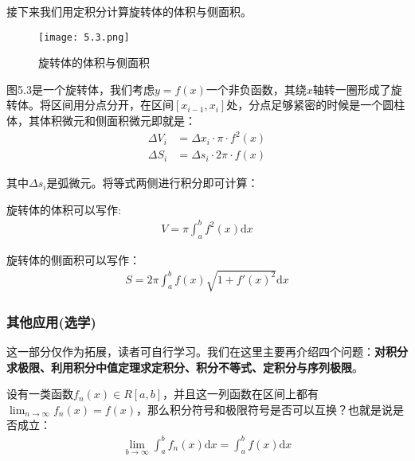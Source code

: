 \documentclass{ctexart}
\let\oldtextbf\textbf %
\renewcommand{\textbf}[1]{\textcolor{btex}{\oldtextbf{#1}}} %
\begin{document}
接下来我们用定积分计算旋转体的体积与侧面积。
\begin{figure}[H]    
\centering     
\renewcommand{\figurename}{图}     
\renewcommand{\thefigure}{5.3}    
\begin{myimagebox}[width=0.43\textwidth] %
\texttt{[image: 5.3.png]} %
\end{myimagebox}     
\caption{\label{fig:5.3}旋转体的体积与侧面积}   
\end{figure}

图5.3是一个旋转体，我们考虑$y=f(x)$一个非负函数，其绕$x$轴转一圈形成了旋转体。将区间用分点分开，在区间$[x_{i-1},x_i]$处，分点足够紧密的时候是一个圆柱体，其体积微元和侧面积微元即就是：
\begin{align*}
    \Delta V_i&=\Delta x_i\cdot \pi \cdot f^2(x)\\
    \Delta S_i&=\Delta s_i\cdot 2\pi\cdot f(x)
\end{align*}

其中$\Delta s_i$是弧微元。将等式两侧进行积分即可计算：
\begin{tcolorbox}[
    colback=bac2,     %
    colframe=fra2,   %
    coltitle=white,             %
    coltext=tex2,
    title=旋转体的侧面积和体积,
    fonttitle=\bfseries,        %
arc=3mm,                     %
breakable
]
旋转体的体积可以写作:
\begin{align*}
    V=\pi\int_a^b f^2(x)\mathrm{d}x\tag{5-13}
\end{align*}

旋转体的侧面积可以写作：
\begin{align*}
    S=2\pi \int_a^b f(x)\sqrt{1+f'(x)^2}\mathrm{d}x\tag{5-14}
\end{align*}
\end{tcolorbox}

\subsubsection{其他应用(选学)}
这一部分仅作为拓展，读者可自行学习。我们在这里主要再介绍四个问题：\textbf{对积分求极限、利用积分中值定理求定积分、积分不等式、定积分与序列极限}。

设有一类函数$f_n(x)\in R[a,b]$，并且这一列函数在区间上都有$\lim_{n\to\infty}f_n(x)=f(x)$，那么积分符号和极限符号是否可以互换？也就是说是否成立：
\begin{align*}
    \lim_{b\to\infty}\int_a^b f_n(x)\mathrm{d}x=\int_a^b f(x)\mathrm{d}x
\end{align*}
\end{document}
